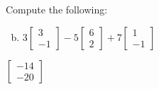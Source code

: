 \documentclass[../main.tex]{subfiles}
\begin{document}
Compute the following:

\begin{enumerate}[a)]
	\setcounter{enumi}{1}
	\item
		$
			3
			\left[\begin{array}{r}
				3 \\
				-1
			\end{array}\right]
			-
			5
			\left[\begin{array}{r}
				6 \\
				2
			\end{array}\right]
			+
			7
			\left[\begin{array}{r}
				1 \\
				-1
			\end{array}\right]
		$
\end{enumerate}

\solution

$\left[\begin{array}{r}
    -14\\
    -20
\end{array}\right]$

\end{document}
